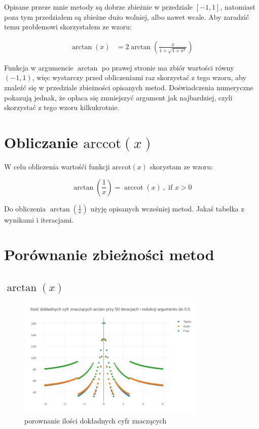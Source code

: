 \documentclass{article}
\begin{document}
Opisane przeze mnie metody są dobrze zbieżnie w przedziale $[-1,1]$, natomiast poza tym przedziałem są zbieżne dużo wolniej, albo nawet wcale.
Aby zaradzić temu problemowi skorzystałem ze wzoru:

\begin{equation}
	{\begin{aligned}\arctan(x)&=2\arctan \left({\frac {x}{1+{\sqrt {1+x^{2}}}}}\right)\end{aligned}}
\end{equation}

Funkcja w argumencie $\arctan$ po prawej stronie ma zbiór wartości równy $(-1,1)$, więc wystarczy przed obliczeniami raz skorzystać z tego wzoru, aby znaleźć się w przedziale zbieżności opisanych metod.
Doświadczenia numeryczne pokazują jednak, że opłaca się zmniejszyć argument jak najbardziej, czyli skorzystać z tego wzoru kilkukrotnie.

\section{Obliczanie $\textrm{arccot}(x)$}
W celu obliczenia wartośći funkcji $\textrm{arccot}(x)$ skorystam ze wzoru:

\begin{equation}
\arctan \left({\frac {1}{x}}\right)=\operatorname {arccot}(x)\,,{\text{ if }}x>0
\end{equation}

Do obliczenia $\arctan(\frac{1}{x})$ użyję opisanych wcześniej metod.
Jakaś tabelka z wynikami i iteracjami.

\clearpage
\section{Porównanie zbieżności metod}
\subsection{$\arctan(x)$}

	\begin{figure}[h]
		\includegraphics[width=0.8\textwidth,scale=0.5]{atan_znaczace.png}
		\caption{porownanie ilości dokładnych cyfr znaczących}
		\label{wskaźnik uwarunkowania}
	\end{figure}
\FloatBarrier
\end{document}

